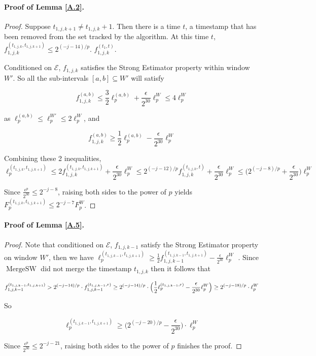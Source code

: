 \documentclass{article}
\newcommand{\est}{\textsf{Strong Estimator }}
\theoremstyle{plain}
\begin{document}
\paragraph{Proof of Lemma \ref{A.2}.}
\begin{proof}
     Suppose $t_{1, j, k+1} \neq t_{1, j, k}+1$. Then there is a time $t$, a timestamp that has been removed from the set tracked by the algorithm. At this time $t$, $f_{1,j,k} ^ {\left(t_{1, j, k}, t_{1, j, k+1}\right)} \leq 2^{(-j-14) /p}$. $f_{1, j, k} ^ {\left(t_1,t\right)}$.

     Conditioned on $\mathcal{E}$, $f_{1, j, k}$ satisfies the \est property within window $W'$. So all the sub-intervals $[a, b] \subseteq W'$ will satisfy 
     
     $$f_{1, j, k} ^ {(a,b)} \le \frac 32 \ell_p ^ {(a, b)} + \frac{\epsilon}{2 ^ {30}}\ell_p ^ {W} \le 4 \ell_p ^  W$$
     
     as $\ell_p ^ {(a, b)} \le \ell_p ^ {W'} \le 2 \ell_p^ W$, and 
     
     $$f_{1, j, k} ^ {(a, b)} \ge \frac 12 \ell_p ^ {(a, b)} - \frac{\epsilon}{2 ^ {30}}\ell_p ^ {W}$$

     Combining these 2 inequalities,
     \[
     \ell_p ^ {(t_{1, j, k}, t_{1, j, k + 1})} \le  2 f_{1, j, k} ^ {(t_{1,j,k}, t_{1, j, k + 1})} + \frac {\epsilon }{2 ^ {30}}\ell_p ^ W  \le 2 ^ {(-j-12) /p} f_{1,j,k} ^ {(t_{1, j, k}, t)} + \frac {\epsilon}{2 ^ {30}} \ell_p ^ W \le \Big(2 ^ {(-j - 8) / p} + \frac {\epsilon}{2 ^ {30}}\Big) \ell_p ^ W 
     \]

     Since $\frac {\epsilon ^ p}{2 ^ {30}} \le 2 ^ {-j-8}$, raising both sides to the power of $p$ yields $F_p ^ {(t_{1,j,k}, t_{1,j,k+1})} \le 2 ^ {-j-7} F_p ^ W$.

\end{proof}

\paragraph{Proof of Lemma \ref{A.5}.}
\begin{proof}
    Note that conditioned on $\mathcal{E}$, $f_{1, j, k-1}$ satisfy the \est property on window $W'$, then we have $\ell_p ^ {\left(t_{1, j, k-1}, t_{1, j, k+1}\right)} \geq \frac{1}{2} f_{1, j, k-1} ^ {(t_{1, j, k-1}, t_{1,j,k+1}) } - \frac {\epsilon}{2 ^ {30}} \ell_p ^ W$ . Since $\operatorname{MergeSW}$ did not merge the timestamp $t_{1, j, k}$ then it follows that 
    
    $$f_{1, j, k-1} ^ {\left(t_{1, j, k-1}, t_{1, j, k+1}\right)}>2^{(-j-14)/p} \cdot f_{1, j, k-1} ^ {\left(t_{1,j,k-1}, r\right)} \\ \ge 2 ^ {(-j-14)/p}\cdot \Big( \frac 12 \ell_p ^ {(t_{1,j,k-1},r) } - \frac{\epsilon}{2 ^ {30}}\ell_p ^ W\Big) \ge 2 ^ {(-j-18)/p} \cdot \ell_p ^ W$$

    So 

    $$\ell_p ^ {(t_{1, j, k-1}, t_{1, j, k+1})} \ge\Big( 2 ^ {(-j-20)/p} -  \frac {\epsilon}{2 ^ {30}}\Big) \cdot \ell_p ^ W$$
    
    Since $\frac {\epsilon ^ p}{ 2 ^ {30}} \le 2 ^ {-j-21}$, raising both sides to the power of $p$ finishes the proof.
\end{proof}
\end{document}

